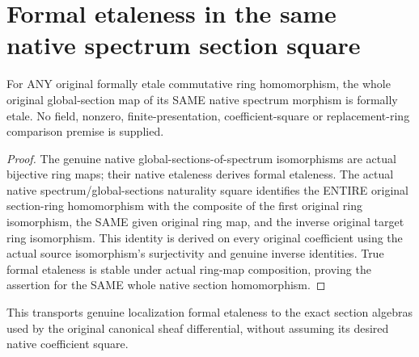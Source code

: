 \section{Formal etaleness in the same native spectrum section square}
\label{sec:spec-formally-etale-sections}

\begin{theorem}
\label{sc0-spec-formally-etale:original-section-map}
\leanok
For ANY original formally etale commutative ring homomorphism,
the whole original global-section map of its SAME native spectrum
morphism is formally etale. No field, nonzero, finite-presentation,
coefficient-square or replacement-ring comparison premise is supplied.
\end{theorem}
\begin{proof}
The genuine native global-sections-of-spectrum isomorphisms are
actual bijective ring maps; their native etaleness derives formal
etaleness. The actual native spectrum/global-sections naturality
square identifies the ENTIRE original section-ring homomorphism
with the composite of the first original ring isomorphism, the
SAME given original ring map, and the inverse original target ring
isomorphism. This identity is derived on every original coefficient
using the actual source isomorphism's surjectivity and genuine
inverse identities. True formal etaleness is stable under actual
ring-map composition, proving the assertion for the SAME whole
native section homomorphism.
\end{proof}

This transports genuine localization formal etaleness to the exact
section algebras used by the original canonical sheaf differential,
without assuming its desired native coefficient square.
